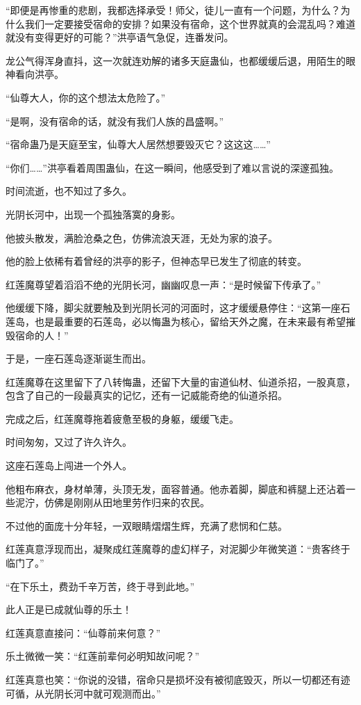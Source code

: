 \begin{this_body}
“即便是再惨重的悲剧，我都选择承受！师父，徒儿一直有一个问题，为什么？为什么我们一定要接受宿命的安排？如果没有宿命，这个世界就真的会混乱吗？难道就没有变得更好的可能？”洪亭语气急促，连番发问。

龙公气得浑身直抖，这一次就连劝解的诸多天庭蛊仙，也都缓缓后退，用陌生的眼神看向洪亭。

“仙尊大人，你的这个想法太危险了。”

“是啊，没有宿命的话，就没有我们人族的昌盛啊。”

“宿命蛊乃是天庭至宝，仙尊大人居然想要毁灭它？这这这……”

“你们……”洪亭看着周围蛊仙，在这一瞬间，他感受到了难以言说的深邃孤独。

时间流逝，也不知过了多久。

光阴长河中，出现一个孤独落寞的身影。

他披头散发，满脸沧桑之色，仿佛流浪天涯，无处为家的浪子。

他的脸上依稀有着曾经的洪亭的影子，但神态早已发生了彻底的转变。

红莲魔尊望着滔滔不绝的光阴长河，幽幽叹息一声：“是时候留下传承了。”

他缓缓下降，脚尖就要触及到光阴长河的河面时，这才缓缓悬停住：“这第一座石莲岛，也是最重要的石莲岛，必以悔蛊为核心，留给天外之魔，在未来最有希望摧毁宿命的人！”

于是，一座石莲岛逐渐诞生而出。

红莲魔尊在这里留下了八转悔蛊，还留下大量的宙道仙材、仙道杀招，一股真意，包含了自己的一段最真实的记忆，还有一记威能奇绝的仙道杀招。

完成之后，红莲魔尊拖着疲惫至极的身躯，缓缓飞走。

时间匆匆，又过了许久许久。

这座石莲岛上闯进一个外人。

他粗布麻衣，身材单薄，头顶无发，面容普通。他赤着脚，脚底和裤腿上还沾着一些泥泞，仿佛是刚刚从田地里劳作归来的农民。

不过他的面庞十分年轻，一双眼睛熠熠生辉，充满了悲悯和仁慈。

红莲真意浮现而出，凝聚成红莲魔尊的虚幻样子，对泥脚少年微笑道：“贵客终于临门了。”

“在下乐土，费劲千辛万苦，终于寻到此地。”

此人正是已成就仙尊的乐土！

红莲真意直接问：“仙尊前来何意？”

乐土微微一笑：“红莲前辈何必明知故问呢？”

红莲真意也笑：“你说的没错，宿命只是损坏没有被彻底毁灭，所以一切都还有迹可循，从光阴长河中就可观测而出。”


\end{this_body}
